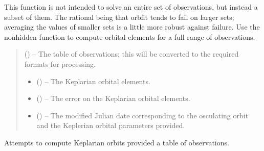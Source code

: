 \documentclass[letterpaper,11pt,english]{sphinxmanual}
\begin{document}
\begin{savenotes}
\begin{fulllineitems}
\begin{savenotes}
\begin{fulllineitems}
\sphinxAtStartPar
This function is not intended to solve an entire set of observations,
but instead a subset of them. The rational being that orbfit tends to
fail on larger sets; averaging the values of smaller sets is a little
more robust against failure. Use the non\sphinxhyphen{}hidden function to compute
orbital elements for a full range of observations.
\begin{quote}\begin{description}
\sphinxAtStartPar
{} () – The table of observations; this will be converted to the
required formats for processing.

\sphinxAtStartPar
\begin{itemize}
\item {} 
\sphinxAtStartPar
{} () – The Keplarian orbital elements.

\item {} 
\sphinxAtStartPar
{} () – The error on the Keplarian orbital elements.

\item {} 
\sphinxAtStartPar
{} () – The modified Julian date corresponding to the osculating orbit and
the Keplerian orbital parameters provided.

\end{itemize}


\end{description}\end{quote}

\end{fulllineitems}\end{savenotes}


\begin{savenotes}\begin{fulllineitems}
\label{\detokenize{code/opihiexarata.orbit.orbfit:opihiexarata.orbit.orbfit.OrbfitOrbitDeterminerEngine.solve_orbit}}
\pysigstartsignatures
{}
\pysigstopsignatures
\sphinxAtStartPar
Attempts to compute Keplarian orbits provided a table of observations.


\end{fulllineitems}
\end{savenotes}
\end{fulllineitems}
\end{savenotes}
\end{document}
